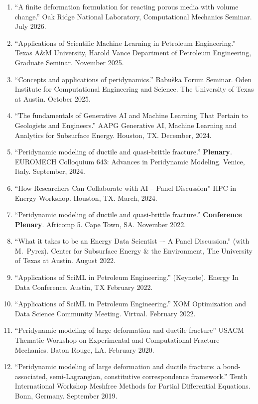 \begin{etaremune}
\else
\begin{enumerate}
\fi
    \item ``A finite deformation formulation for reacting porous media with volume change.'' Oak Ridge National Laboratory, Computational Mechanics Seminar. July 2026.
    \item ``Applications of Scientific Machine Learning in Petroleum Engineering.'' Texas A\&M University, Harold Vance Department of Petroleum Engineering, Graduate Seminar. November 2025.
    \item ``Concepts and applications of peridynamics.'' Babu\v{s}ka Forum Seminar. Oden Institute for Computational Engineering and Science. The University of Texas at Austin. October 2025.
    \item ``The fundamentals of Generative AI and Machine Learning That Pertain to Geologists and Engineers.''  AAPG Generative AI, Machine Learning and Analytics for Subsurface Energy. Houston, TX.  December, 2024.
    \item ``Peridynamic modeling of ductile and quasi-brittle fracture.'' {\bf Plenary}. EUROMECH Colloquium 643: Advances in Peridynamic Modeling. Venice, Italy.  September, 2024.
    \item ``How Researchers Can Collaborate with AI -- Panel Discussion''  HPC in Energy Workshop. Houston, TX.  March, 2024.
    \item ``Peridynamic modeling of ductile and quasi-brittle fracture.''  {\bf Conference Plenary}. Africomp 5. Cape Town, SA.  November 2022.
    \item ``What it takes to be an Energy Data Scientist –- A Panel Discussion.'' (with M.\ Pyrcz). Center for Subsurface Energy \& the Environment, The University of Texas at Austin.  August 2022.
    \item ``Applications of SciML in Petroleum Engineering.'' (Keynote). Energy In Data Conference. Austin, TX February 2022.
    \item ``Applications of SciML in Petroleum Engineering.'' XOM Optimization and Data Science Community Meeting.  Virtual. February 2022.
    \item ``Peridynamic modeling of large deformation and ductile fracture'' USACM Thematic Workshop on Experimental and Computational Fracture Mechanics. Baton Rouge, LA. February 2020.
    \item ``Peridynamic modeling of large deformation and ductile fracture: a bond-associated, semi-Lagrangian, constitutive correspondence framework.'' Tenth International Workshop Meshfree Methods for Partial Differential Equations. Bonn, Germany. September 2019.

\end{enumerate}
\end{etaremune}
